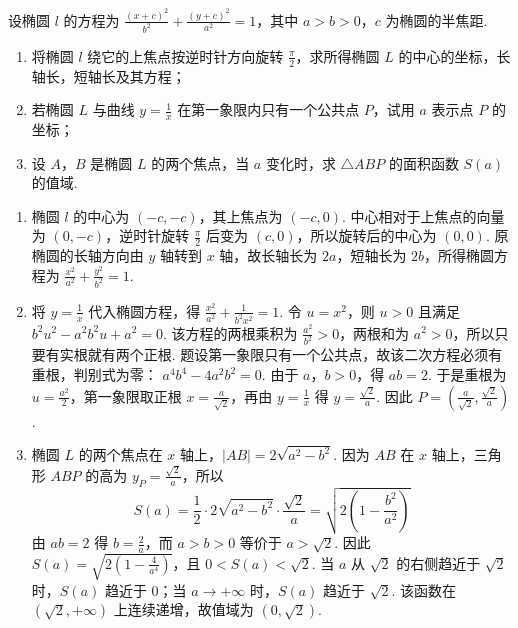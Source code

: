 \begin{problem}
设椭圆 \(l\) 的方程为 \(\frac{(x+c)^{2}}{b^{2}}+\frac{(y+c)^{2}}{a^{2}}=1 \)，其中 \(a>b>0\)，\(c\) 为椭圆的半焦距.

\begin{enumerate}
\item 将椭圆 \(l\) 绕它的上焦点按逆时针方向旋转 \(\frac{\pi}{2} \)，求所得椭圆 \(L\) 的中心的坐标，长轴长，短轴长及其方程；
\item 若椭圆 \(L\) 与曲线 \(y=\frac{1}{x} \) 在第一象限内只有一个公共点 \(P\)，试用 \(a\) 表示点 \(P\) 的坐标；
\item 设 \(A\)，\(B\) 是椭圆 \(L\) 的两个焦点，当 \(a\) 变化时，求 \(\triangle ABP \) 的面积函数 \(S(a) \) 的值域.
\end{enumerate}
\end{problem}

\begin{solution}
\begin{enumerate}
\item 椭圆 \(l\) 的中心为 \((-c,-c)\)，其上焦点为 \((-c,0)\). 中心相对于上焦点的向量为 \((0,-c)\)，逆时针旋转 \(\frac\pi2\) 后变为 \((c,0)\)，所以旋转后的中心为 \((0,0)\). 原椭圆的长轴方向由 \(y\) 轴转到 \(x\) 轴，故长轴长为 \(2a\)，短轴长为 \(2b\)，所得椭圆方程为 \(\frac{x^2}{a^2}+\frac{y^2}{b^2}=1\).

\item 将 \(y=\frac{1}{x}\) 代入椭圆方程，得 \(\frac{x^2}{a^2}+\frac{1}{b^2x^2}=1\). 令 \(u=x^2\)，则 \(u>0\) 且满足
\(b^2u^2-a^2b^2u+a^2=0\). 该方程的两根乘积为 \(\frac{a^2}{b^2}>0\)，两根和为 \(a^2>0\)，所以只要有实根就有两个正根. 题设第一象限只有一个公共点，故该二次方程必须有重根，判别式为零：
\(a^4b^4-4a^2b^2=0\). 由于 \(a\)，\(b>0\)，得 \(ab=2\). 于是重根为 \(u=\frac{a^2}{2}\)，第一象限取正根 \(x=\frac{a}{\sqrt2}\)，再由 \(y=\frac{1}{x}\) 得 \(y=\frac{\sqrt2}{a}\). 因此 \(P=\left(\frac{a}{\sqrt2},\frac{\sqrt2}{a}\right)\).

\item 椭圆 \(L\) 的两个焦点在 \(x\) 轴上，\(|AB|=2\sqrt{a^2-b^2}\). 因为 \(AB\) 在 \(x\) 轴上，三角形 \(ABP\) 的高为 \(y_P=\frac{\sqrt2}{a}\)，所以
\[
S(a)=\frac12\cdot2\sqrt{a^2-b^2}\cdot\frac{\sqrt2}{a}=\sqrt{2\left(1-\frac{b^2}{a^2}\right)}
\]
由 \(ab=2\) 得 \(b=\frac{2}{a}\)，而 \(a>b>0\) 等价于 \(a>\sqrt2\). 因此
\(S(a)=\sqrt{2\left(1-\frac4{a^4}\right)}\)，且 \(0<S(a)<\sqrt2\). 当 \(a\) 从 \(\sqrt2\) 的右侧趋近于 \(\sqrt2\) 时，\(S(a)\) 趋近于 \(0\)；当 \(a\to+\infty\) 时，\(S(a)\) 趋近于 \(\sqrt2\). 该函数在 \((\sqrt2,+\infty)\) 上连续递增，故值域为 \((0,\sqrt2)\).
\end{enumerate}
\end{solution}
